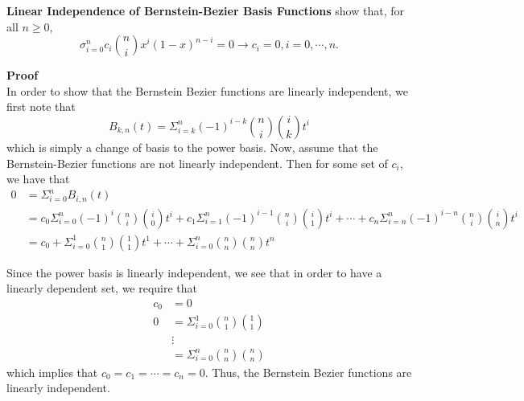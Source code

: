 \textbf{Linear Independence of Bernstein-Bezier Basis Functions} show that, for all $n \geq 0$, 
$$\sigma_{i = 0}^n c_i \binom{n}{i} x^i (1 - x)^{n - i} = 0 \rightarrow c_i = 0, i = 0, \cdots, n.$$

\textbf{Proof}\\
In order to show that the Bernstein Bezier functions are linearly independent, we first note that 
$$B_{k, n}(t) = \Sigma_{i = k}^n (-1)^{i - k} \binom{n}{i} \binom{i}{k}t^i$$
which is simply a change of basis to the power basis. Now, assume that the Bernstein-Bezier functions are not linearly independent. Then for some set of $c_i$, we have that
\begin{align*}
 0 &= \Sigma_{i = 0}^n B_{i, n}(t) \\
 &= c_0 \Sigma_{i = 0}^n (-1)^i \binom{n}{i} \binom{i}{0}t^i + c_1 \Sigma_{i = 1}^n (-1)^{i - 1} \binom{n}{i} \binom{i}{1}t^i + \cdots + c_n \Sigma_{i = n}^n (-1)^{i - n} \binom{n}{i} \binom{i}{n}t^i\\
 &= c_0 + \Sigma_{i = 0}^1 \binom{n}{1} \binom{1}{1}t^1+ \cdots + \Sigma_{i = 0}^n \binom{n}{n} \binom{n}{n}t^n
 \end{align*}

 Since the power basis is linearly independent, we see that in order to have a linearly dependent set, we require that 
 \begin{align*}
c_0 &= 0\\
0 &= \Sigma_{i = 0}^1 \binom{n}{1} \binom{1}{1}\\
&\vdots\\
&= \Sigma_{i = 0}^n \binom{n}{n} \binom{n}{n}
 \end{align*}
 which implies that $c_0 = c_1 = \cdots = c_n = 0$. Thus, the Bernstein Bezier functions are linearly independent.
